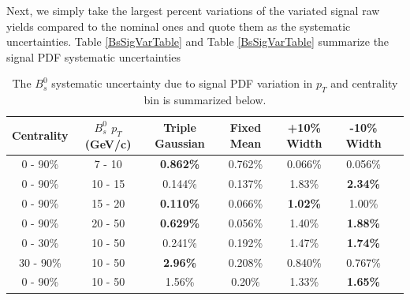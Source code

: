 Next, we simply take the largest percent variations of the variated signal raw yields compared to the nominal ones and quote them as the systematic uncertainties. Table \ref{BsSigVarTable} and Table \ref{BsSigVarTable} summarize the signal PDF systematic uncertainties 

\begin{table}[h]
\begin{center}
\caption{The $B^0_s$ systematic uncertainty due to signal PDF variation in $p_T$ and centrality bin is summarized below.}
\vspace{1em}
\label{BsPTShape}
  \begin{tabular}{| c | c |c | c| c| c| c| }
    \hline
     Centrality & $B^0_s$ $p_T$ (GeV/c) & Triple Gaussian &  Fixed Mean & +10\% Width & -10\% Width  \\
    \hline
    \hline
0 - 90\% & 7 - 10 &   \textbf{0.862\% }  &  0.762\% & 0.066\% &  0.056\% \\ 
0 - 90\% & 10 - 15 & 0.144\%  & 0.137\%  & 1.83\% &   \textbf{2.34\%}  \\ 
0 - 90\% & 15 - 20 &  \textbf{0.110\% }  & 0.066\%   &  \textbf{1.02\%} &  1.00\% \\ 
0 - 90\% & 20 - 50 &  \textbf{0.629\% }   & 0.056\%  &  1.40\%  &   \textbf{1.88\%}\\ 
0 - 30\% & 10 - 50  & 0.241\%  & 0.192\%  &1.47\% &  \textbf{1.74\%} \\ 
30 - 90\% & 10 - 50 &  \textbf{2.96\%} &   0.208\%  & 0.840\% &  0.767\%\\ 
0 - 90\% & 10 - 50 &  1.56\%   & 0.20\%  & 1.33\% &   \textbf{1.65\%} \\ 
    \hline
    \hline
\end{tabular}
\end{center}
\end{table}



